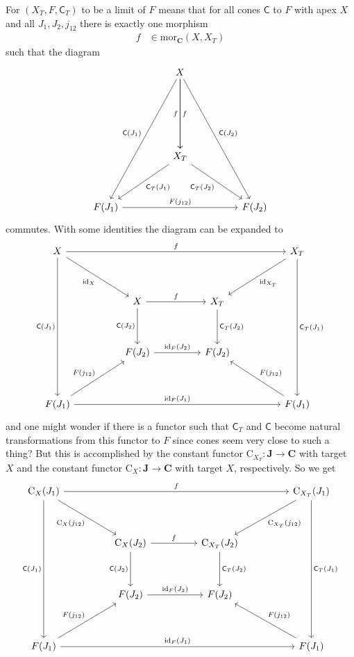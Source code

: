 For $(X_{T},F,\mathsf{C}_{T})$ to be a limit of $F$ means that for all cones $\mathsf{C}$ to $F$ with apex $X$ and all $J_{1},J_{2},j_{12}$ there is exactly one morphism
\begin{align*}
  f
  &\in
  \mathrm{mor}_{\mathbf{C}}(X,X_{T})
\end{align*}
such that the diagram
\[
\begin{tikzcd}[sep=huge]
  &
  X
  \arrow{dddr}{\mathsf{C}(J_{2})}
  \arrow{dd}{f}
  \arrow[swap]{dd}{f}
  \arrow[swap]{dddl}{\mathsf{C}(J_{1})}
  &
  \\
  &
  &
  \\
  &
  X_{T}
  \arrow[swap]{dr}{\mathsf{C}_{T}(J_{2})}
  \arrow{dl}{\mathsf{C}_{T}(J_{1})}
  &
  \\
  F(J_{1})
  \arrow{rr}{F(j_{12})}
  &
  &
  F(J_{2})
\end{tikzcd}
\]
commutes. With some identities the diagram can be expanded to
\[
\begin{tikzcd}[sep=huge]
  X
  \arrow{rrr}{f}
  \arrow[swap]{dr}{\mathrm{id}_{X}}
  \arrow[swap]{ddd}{\mathsf{C}(J_{1})}
  &
  &
  &
  X_{T}
  \arrow{ddd}{\mathsf{C}_{T}(J_{1})}
  \arrow{dl}{\mathrm{id}_{X_{T}}}
  \\
  &
  X
  \arrow{r}{f}
  \arrow[swap]{d}{\mathsf{C}(J_{2})}
  &
  X_{T}
  \arrow{d}{\mathsf{C}_{T}(J_{2})}
  &
  \\
  &
  F(J_{2})
  \arrow{r}{\mathrm{id}_{F}(J_{2})}
  &
  F(J_{2})
  &
  \\
  F(J_{1})
  \arrow{rrr}{\mathrm{id}_{F}(J_{1})}
  \arrow{ur}{F(j_{12})}
  &
  &
  &
  F(J_{1})
  \arrow[swap]{ul}{F(j_{12})}
\end{tikzcd}
\]
and one might wonder if there is a functor such that $\mathsf{C}_{T}$ and $\mathsf{C}$ become natural transformations from this functor to $F$ since cones seem very close to such a thing? But this is accomplished by the constant functor $\mathrm{C}_{X_{T}} \colon \mathbf{J} \rightarrow \mathbf{C}$ with target $X$ and the constant functor $\mathrm{C}_{X} \colon \mathbf{J} \rightarrow \mathbf{C}$ with target $X$, respectively. So we get
\[
\begin{tikzcd}[sep=huge]
  \mathrm{C}_{X}(J_{1})
  \arrow{rrr}{f}
  \arrow[swap]{dr}{\mathrm{C}_{X}(j_{12})}
  \arrow[swap]{ddd}{\mathsf{C}(J_{1})}
  &
  &
  &
  \mathrm{C}_{X_{T}}(J_{1})
  \arrow{ddd}{\mathsf{C}_{T}(J_{1})}
  \arrow{dl}{\mathrm{C}_{X_{T}}(j_{12})}
  \\
  &
  \mathrm{C}_{X}(J_{2})
  \arrow{r}{f}
  \arrow[swap]{d}{\mathsf{C}(J_{2})}
  &
  \mathrm{C}_{X_{T}}(J_{2})
  \arrow{d}{\mathsf{C}_{T}(J_{2})}
  &
  \\
  &
  F(J_{2})
  \arrow{r}{\mathrm{id}_{F}(J_{2})}
  &
  F(J_{2})
  &
  \\
  F(J_{1})
  \arrow{rrr}{\mathrm{id}_{F}(J_{1})}
  \arrow{ur}{F(j_{12})}
  &
  &
  &
  F(J_{1})
  \arrow[swap]{ul}{F(j_{12})}
\end{tikzcd}
\]
